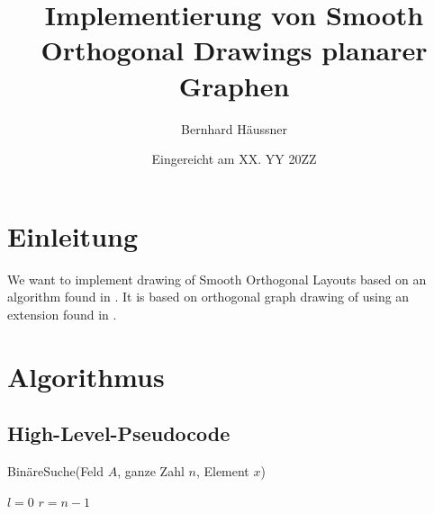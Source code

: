 \documentclass[a4paper]{scrreprt}
\theoremstyle{definition}
\begin{document}


\subject{Bachelorarbeit}
\title{Implementierung von Smooth Orthogonal Drawings planarer Graphen} %
\author{Bernhard Häussner} %
\date{Eingereicht am XX. YY 20ZZ} %
\titlehead{Julius-Maximilians-Universität Würzburg\\
Institut für Informatik\\
Lehrstuhl für Informatik I\\
Effiziente Algorithmen und wissensbasierte Systeme}
\publishers{Betreuer:\\
Prof.\ Dr.\ Alexander Wolff\\
Dipl.-Inf.\ Philipp Kindermann} %
\maketitle
\tableofcontents






\chapter{Einleitung}



We want to implement drawing of Smooth Orthogonal Layouts based on an algorithm found in
\cite{smooth-13}. It is based on orthogonal graph drawing of \cite{biedl+kant-98} using an
extension found in \cite{liu+etal-98}.

\chapter{Algorithmus}

\section{High-Level-Pseudocode}


\begin{algorithm}[ht]
  \caption{BinäreSuche(Feld $A$, ganze Zahl $n$, Element $x$)}
  \label{alg:binsearch}
  
  $l = 0$ \;
  $r = n-1$ \;
  
  \Return \False
\end{algorithm}
\end{document}
